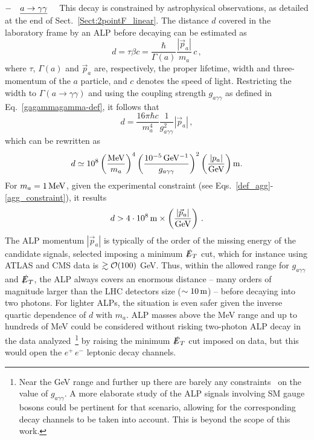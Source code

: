 \documentclass[11pt]{article}
\newcommand{\ETmiss}{\slashed{E}_T}
\renewcommand{\to}{\rightarrow}
\newcommand{\beq}{\begin{equation}}
\newcommand{\eeq}{\end{equation}}
\renewcommand{\[}{\begin{equation}}
\renewcommand{\]}{\end{equation}}
\begin{document}
  \vspace{2mm}
 \noindent $- \quad {\uline{a\to\gamma\gamma}}\quad$   This decay is constrained by astrophysical observations, as detailed at the 
 end of Sect.~\ref{Sect:2pointF_linear}. The distance $d$ covered in the laboratory 
 frame by an ALP before decaying can be estimated as 
 \begin{equation}
  d = \tau \beta c = \frac{\hbar}{\Gamma(a)}\frac{|\vec{p}_a|}{m_a}\, c\,,
 \end{equation} 
 where $\tau$, $\Gamma(a)$ and $\vec{p}_a$ are, respectively, the proper lifetime, width and three-momentum of the $a$ particle, and $c$ denotes the speed of light. 
 Restricting the width to $\Gamma(a\to\gamma\gamma)$ and using the coupling strength $g_{a\gamma\gamma}$ as defined in Eq.~\eqref{gagammagamma-def},  it follows that
 \begin{equation}
  d = \frac{16\pi \hbar c}{m_a^4}\frac{1}{g_{a\gamma\gamma}^2}|\vec{p}_a|\,,
 \end{equation} 
which can be rewritten as
 \beq
 d\simeq10^8 \left( \frac{\unit[]{MeV}}{m_a}\right)^4 \left(\frac{\unit[10^{-5}]{GeV^{-1}}}{g_{a\gamma\gamma}}\right)^2 \left(\frac{|p_a|}{\unit{GeV}}\right)\unit[]{m}. 
\eeq
   For $m_a=\unit[1]{MeV}$, given the experimental constraint (see Eqs.~\eqref{def_agg}-\eqref{agg_constraint}), it results
 \begin{equation}
 d> 4 \cdot \unit[10^8]{m} \times \left(\frac{|\vec{p}_a|}{\unit{GeV}}\right) \,.  
 \end{equation} 
  The ALP momentum $|\vec{p}_a|$ is typically of the order of the missing energy of the candidate signals, selected imposing a minimum $\ETmiss$ cut, which for instance 
  using ATLAS and CMS data is  $\gtrsim {\cal O}( 100)$ GeV.  Thus, within the allowed range for $g_{a\gamma\gamma}$ and $\ETmiss$, the ALP always covers an enormous 
  distance -- many orders of magnitude larger than the LHC detectors size ($\sim \unit[10]{m}$) -- before decaying into two photons. For lighter ALPs, the situation 
  is even  safer given the inverse quartic dependence of $d$ with $m_a$.  ALP masses above the MeV range and up to hundreds of MeV could be considered without risking 
  two-photon ALP decay in the data analyzed~\footnote{Near the GeV range and further up there are barely any constraints~\cite{Mimasu:2014nea}  on 
  the value of $g_{a\gamma\gamma}$. A more elaborate study of the ALP signals involving SM gauge bosons could be pertinent for that scenario, allowing for the 
  corresponding decay channels to be taken into account. This is beyond the scope of this work.} by raising the minimum $\ETmiss$ cut imposed on data, but this 
  would open the $e^+\,e^-$ leptonic decay channels. 
 
\end{document}
